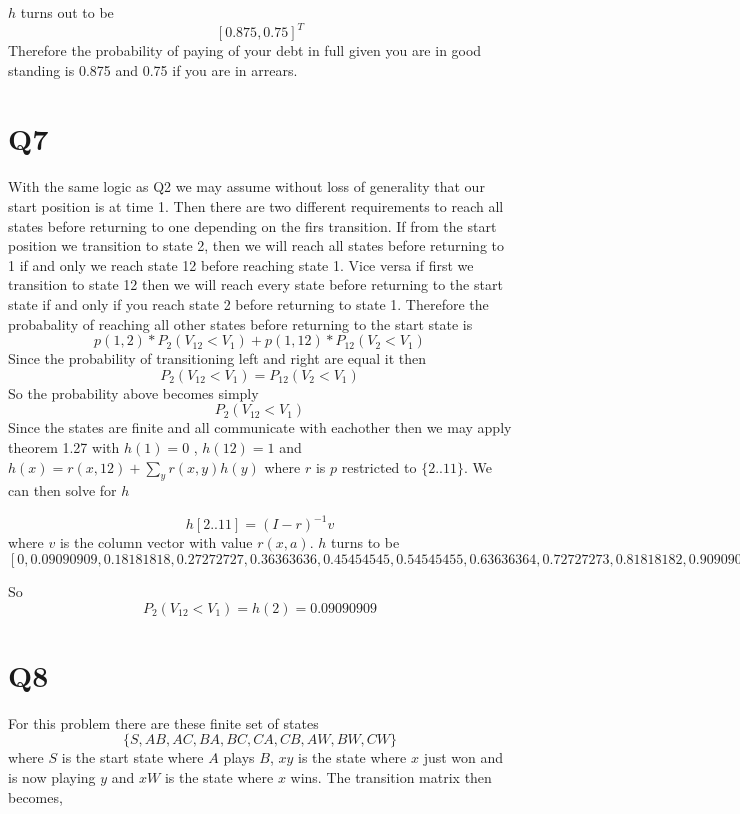 \documentclass{article}
\begin{document}
$h$ turns out to be
\[
[ 0.875,  0.75 ]^T
\]
Therefore the probability of paying of your debt in full given you are in good standing is 0.875 and 0.75 if you are in arrears. 

\section*{Q7}
With the same logic as Q2 we may assume without loss of generality that our start position is at time 1. Then there are two different requirements to reach all states before returning to one depending on the firs transition. If from the start position we transition to state 2, then we will reach all states before returning to 1 if and only we reach state 12 before reaching state 1. Vice versa if first we transition to state 12 then we will reach every state before returning to the start state if and only if you reach state 2 before returning to state 1. 
Therefore the probabality of reaching all other states before returning to the start state is
\[
p(1,2)*P_2(V_12 < V_1) + p(1,12)*P_12(V_2 < V_1)
\]
Since the probability of transitioning left and right are equal it then 
\[
P_2(V_{12} < V_1) = P_12(V_2 < V_1)
\]
So the probability above becomes simply
\[
P_2(V_{12} < V_1)
\]
Since the states are finite and all communicate with eachother then we may apply theorem 1.27 with $h(1) = 0$ , $h(12) = 1$ and $h(x) = r(x,12) + \sum_y r(x,y)h(y)$ where $r$ is $p$ restricted to $\{2..11\}$. 
We can then solve for $h$

\[
h[2 .. 11] = (I -r)^{-1} v
\]
where $v$ is the column vector with value $r(x,a)$.
$h$ turns to be 
\[
[0, 0.09090909,  0.18181818,  0.27272727,  0.36363636,  0.45454545,
        0.54545455,  0.63636364,  0.72727273,  0.81818182,  0.90909091,1]
\]

So
\[
P_2(V_{12} < V_1) = h(2) = 0.09090909
\]

\section*{Q8}
For this problem there are these finite set of states
\[
\{S, AB, AC, BA, BC, CA, CB, AW, BW, CW\}
\]
where $S$ is the start state where $A$ plays $B$, $xy$ is the state where $x$ just won and is now playing $y$ and $xW$ is the state where $x$ wins. 
The transition matrix then becomes,
\end{document}
